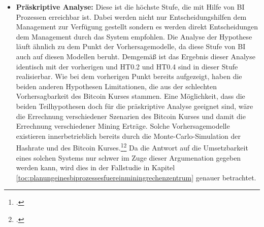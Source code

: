 \begin{itemize}
    Letztendlich kann festgehalten werden, dass der Bitcoin Preis nur bedingt vorhergesagt werden kann, da einige Einflussfaktoren, wie
    beispielsweise Social Media, nicht vorhergesagt werden können und sich mathematischen Möglichkeiten der Analyse weitestgehend entziehen.\footcite[Vgl.][]{forbes2021musk}\footcite[Vgl.][S. 325]{badertscher2017bitcoin}
    Generell ist dies allerdings kein ausschließliches Problem, das bei Bitcoin auftritt. Bei den klassischen Märkten ist das gleiche
    Problem bemerkbar. Aufgrund der hohen Volatilität des Bitcoin Kurses ist es in diesem Fall jedoch auffälliger.
    Andere \acp{KPI}, wie beispielsweise \ac{OpEx} Kosten oder technische \acp{KPI}, sind im Gegensatz dazu prognostizierbar, da diese
    wenig bis keine Schwankungen unterliegen und somit die Ergebnisse der deskriptiven Analyse unter diesem Paradigma weiterhin
    verwendet werden können. 
    Demnach ist feststellbar, dass \ac{HT0.2} und \ac{HT0.4} für Vorhersagemodelle geeignet sind, da diese ausschließlich \acp{KPI} verwendet,
    die in ausreichender Qualität simuliert werden können. Bei \ac{HT0.1} und \ac{HT0.3} können auch vorhersagende Modelle angewendet werden,
    wobei eine Limitation durch die Vorhersage des Bitcoin Kurses festgestellt werden kann. Dies kann durch eine geeignete Kombination der
    Analysemodelle verbessert werden. Falls es möglich ist, die unstrukturierten und inkonsistenten Daten aus Social Media Plattformen passend zu analysieren,
    sollten diese in die Vorhersagemodellierungen integriert werden. Um einen möglichst guten Eindruck des \ac{BTC} Kurses zu erhalten,
    ist es wichtig mit Echtzeitverarbeitung dieser Daten zu arbeiten.
    \item \textbf{Präskriptive Analyse: }Diese ist die höchste Stufe, die mit Hilfe von \ac{BI} Prozessen erreichbar ist. Dabei werden
    nicht nur Entscheidungshilfen dem Management zur Verfügung gestellt sondern es werden direkt Entscheidungen dem Management durch
    das System empfohlen. Die Analyse der Hypothese läuft ähnlich zu dem Punkt der Vorhersagemodelle, da diese Stufe von \ac{BI} auch
    auf diesen Modellen beruht. Demgemäß ist das Ergebnis dieser Analyse identisch mit der vorherigen und \ac{HT0.2} und \ac{HT0.4} sind in dieser 
    Stufe realisierbar. Wie bei dem vorherigen Punkt bereits aufgezeigt, haben die beiden anderen Hypothesen Limitationen, die aus
    der schlechten Vorhersagbarkeit des Bitcoin Kurses stammen. Eine Möglichkeit, dass die beiden Teilhypothesen doch für die
    präskriptive Analyse geeignet sind, wäre die Errechnung verschiedener Szenarien des Bitcoin Kurses und damit die Errechnung
    verschiedener Mining Erträge. Solche Vorhersagemodelle existieren innerbetrieblich bereits durch die Monte-Carlo-Simulation der Hashrate
    und des Bitcoin Kurses.\footcite[Vgl.][]{appendix:mcpreis}\footcite[Vgl.][]{appendix:mchashrate}
    Da die Antwort auf die Umsetzbarkeit eines solchen Systems nur schwer im Zuge dieser Argumenation gegeben werden kann, wird
    dies in der Fallstudie in Kapitel \ref{toc:planungeinesbiprozessesfuereinminingrechenzentrum} genauer betrachtet.
\end{itemize}

